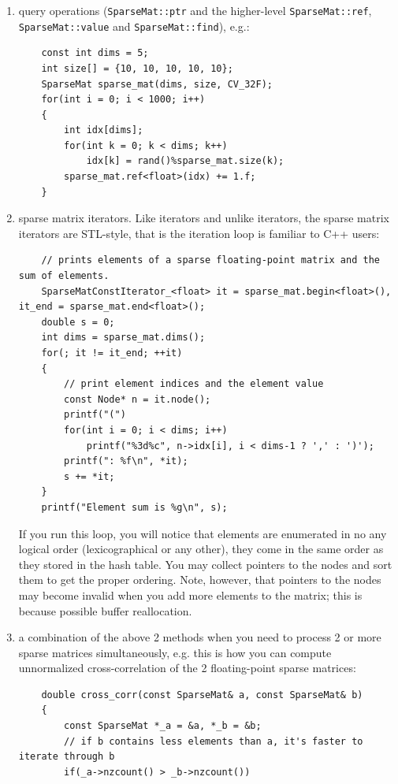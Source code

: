 \begin{enumerate}
    \item query operations (\texttt{SparseMat::ptr} and the higher-level \texttt{SparseMat::ref}, \texttt{SparseMat::value} and \texttt{SparseMat::find}), e.g.:
    \begin{lstlisting}
    const int dims = 5;
    int size[] = {10, 10, 10, 10, 10};
    SparseMat sparse_mat(dims, size, CV_32F);
    for(int i = 0; i < 1000; i++)
    {
        int idx[dims];
        for(int k = 0; k < dims; k++)
            idx[k] = rand()%sparse_mat.size(k);
        sparse_mat.ref<float>(idx) += 1.f;
    }
    \end{lstlisting}
    \item sparse matrix iterators. Like  iterators and unlike  iterators, the sparse matrix iterators are STL-style, that is the iteration loop is familiar to C++ users:
    \begin{lstlisting}
    // prints elements of a sparse floating-point matrix and the sum of elements.
    SparseMatConstIterator_<float> it = sparse_mat.begin<float>(), it_end = sparse_mat.end<float>();
    double s = 0;
    int dims = sparse_mat.dims();
    for(; it != it_end; ++it)
    {
        // print element indices and the element value
        const Node* n = it.node();
        printf("(")
        for(int i = 0; i < dims; i++)
            printf("%3d%c", n->idx[i], i < dims-1 ? ',' : ')');
        printf(": %f\n", *it);    
        s += *it;
    }
    printf("Element sum is %g\n", s);
    \end{lstlisting}
    If you run this loop, you will notice that elements are enumerated in no any logical order (lexicographical or any other), they come in the same order as they stored in the hash table. You may collect pointers to the nodes and sort them to get the proper ordering. Note, however, that pointers to the nodes may become invalid when you add more elements to the matrix; this is because possible buffer reallocation.
    \item a combination of the above 2 methods when you need to process 2 or more sparse matrices simultaneously, e.g. this is how you can compute unnormalized cross-correlation of the 2 floating-point sparse matrices:
    \begin{lstlisting}
    double cross_corr(const SparseMat& a, const SparseMat& b)
    {
        const SparseMat *_a = &a, *_b = &b;
        // if b contains less elements than a, it's faster to iterate through b
        if(_a->nzcount() > _b->nzcount())

\end{lstlisting}
\end{enumerate}
